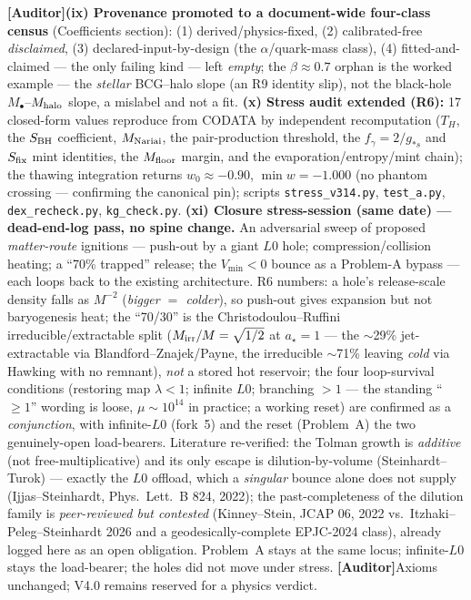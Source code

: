 \documentclass[11pt]{article}
\newcommand{\Auditor}{\textbf{\textcolor{teal!55!black}{[Auditor]}}}
\begin{document}
{\Auditor \textbf{(ix) Provenance promoted to a document-wide four-class census} (Coefficients section): (1) derived/physics-fixed, (2) calibrated-free \emph{disclaimed}, (3) declared-input-by-design (the $\alpha$/quark-mass class), (4) fitted-and-claimed --- the only failing kind --- left \emph{empty}; the $\beta\approx0.7$ orphan is the worked example --- the \emph{stellar} BCG--halo slope (an R9 identity slip), not the black-hole $M_\bullet$--$M_{\rm halo}$ slope, a mislabel and not a fit. \textbf{(x) Stress audit extended (R6):} 17 closed-form values reproduce from CODATA by independent recomputation ($T_H$, the $S_{\rm BH}$ coefficient, $M_{\rm Nariai}$, the pair-production threshold, the $f_\gamma=2/g_{*s}$ and $S_{\rm fix}$ mint identities, the $M_{\rm floor}$ margin, and the evaporation/entropy/mint chain); the thawing integration returns $w_0\approx-0.90$, $\min w=-1.000$ (no phantom crossing --- confirming the canonical pin); scripts \texttt{stress\_v314.py}, \texttt{test\_a.py}, \texttt{dex\_recheck.py}, \texttt{kg\_check.py}. \textbf{(xi) Closure stress-session (same date) --- dead-end-log pass, no spine change.} An adversarial sweep of proposed \emph{matter-route} ignitions --- push-out by a giant $L0$ hole; compression/collision heating; a ``70\% trapped'' release; the $V_{\min}<0$ bounce as a Problem-A bypass --- each loops back to the existing architecture. R6 numbers: a hole's release-scale density falls as $M^{-2}$ (\emph{bigger $=$ colder}), so push-out gives expansion but not baryogenesis heat; the ``70/30'' is the Christodoulou--Ruffini irreducible/extractable split ($M_{\rm irr}/M=\sqrt{1/2}$ at $a_\star=1$ --- the $\sim$29\% jet-extractable via Blandford--Znajek/Payne, the irreducible $\sim$71\% leaving \emph{cold} via Hawking with no remnant), \emph{not} a stored hot reservoir; the four loop-survival conditions (restoring map $\lambda<1$; infinite $L0$; branching $>1$ --- the standing ``$\ge1$'' wording is loose, $\mu\sim10^{14}$ in practice; a working reset) are confirmed as a \emph{conjunction}, with infinite-$L0$ (fork~5) and the reset (Problem~A) the two genuinely-open load-bearers. Literature re-verified: the Tolman growth is \emph{additive} (not free-multiplicative) and its only escape is dilution-by-volume (Steinhardt--Turok) --- exactly the $L0$ offload, which a \emph{singular} bounce alone does not supply (Ijjas--Steinhardt, Phys.\ Lett.\ B 824, 2022); the past-completeness of the dilution family is \emph{peer-reviewed but contested} (Kinney--Stein, JCAP 06, 2022 vs.\ Itzhaki--Peleg--Steinhardt 2026 and a geodesically-complete EPJC-2024 class), already logged here as an open obligation. Problem~A stays at the same locus; infinite-$L0$ stays the load-bearer; the holes did not move under stress. \Auditor Axioms unchanged; V4.0 remains reserved for a physics verdict.

}
\end{document}
